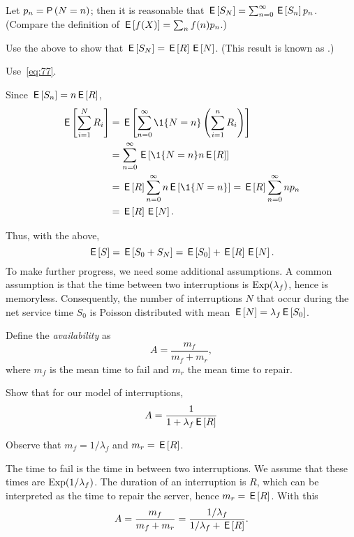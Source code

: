 Let $p_n=\P{N=n}$; then it is reasonable that $\,\mathsf{E}\left[S_N\right]=\sum_{n=0}^\infty \,\mathsf{E}\left[S_n\right]p_n$. (Compare the definition of $\,\mathsf{E}\left[f(X)\right]=\sum_{n} f(n) p_n$.)

\begin{exercise}[\faCalculator]\label{ex:16}
Use the above to show that $\,\mathsf{E}\left[S_N\right]=\,\mathsf{E}\left[R\right] \,\mathsf{E}\left[N\right]$. (This result is known as .)
\begin{hint}
  Use~\eqref{eq:77}. 
\end{hint}
\begin{solution}
Since $\,\mathsf{E}\left[S_n\right] = n \,\mathsf{E}\left[R\right]$, 
\begin{align*}
  \E{\sum_{i=1}^N R_i} 
&=  \E{ \sum_{n=0}^\infty \1{N=n} \left(\sum_{i=1}^n R_i \right)} \\
&=  \sum_{n=0}^\infty \E{\1{N=n} n\E{R}} \\
&=  \E{R} \sum_{n=0}^\infty n \E{\1{N=n}} = \E R \sum_{n=0}^\infty n p_n\\
&= \E R \E N.
\end{align*}
\end{solution}
\end{exercise}

Thus, with the above, 
\begin{equation*}
  \,\mathsf{E}\left[S\right] = \,\mathsf{E}\left[S_0 + S_N\right] = \,\mathsf{E}\left[S_0\right] + \,\mathsf{E}\left[R\right] \,\mathsf{E}\left[N\right].
\end{equation*}
To make further progress, we need some additional assumptions.
A common assumption is that the time between two interruptions is $\operatorname{Exp}(\lambda_f)$, hence is memoryless.
Consequently, the number of interruptions $N$ that occur during the net service time $S_0$ is  Poisson distributed with mean $\,\mathsf{E}\left[N\right] = \lambda_f \,\mathsf{E}\left[S_0\right]$.


Define the \emph{availability} as
\begin{equation*}
  A=\frac{m_f}{m_f + m_r},
\end{equation*}
where $m_f$ is the mean time to fail and $m_r$ the mean time to repair. 
\begin{exercise}[\faFlask]
  Show that  for our model of interruptions,
  \begin{equation*}
A=\frac 1{1+\lambda_f \,\mathsf{E}\left[R\right]}
  \end{equation*}
  \begin{hint}
    Observe that $m_f = 1/\lambda_f$ and $m_r = \,\mathsf{E}\left[R\right]$.
  \end{hint}
  \begin{solution}
The time to fail is the time in between two interruptions. We assume that these times are $\operatorname{Exp}(1/\lambda_f)$. The duration of an interruption is $R$, which can be interpreted as the time to repair the server, hence $m_r = \,\mathsf{E}\left[R\right]$. With this
\begin{equation*}
  A=\frac{m_f}{m_f + m_r}=\frac{1/\lambda_f }{1/\lambda_f + \,\mathsf{E}\left[R\right]}. 
\end{equation*}
  \end{solution}
\end{exercise}


